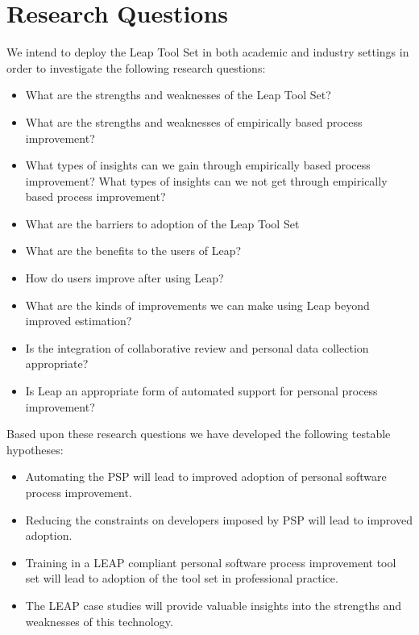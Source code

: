 \documentclass[12pt]{article}
\begin{document}
\section*{Research Questions}

We intend to deploy the Leap Tool Set in both academic and industry
settings in order to investigate the following research questions:
\begin{itemize}

\item{What are the strengths and weaknesses of the Leap Tool Set?}
  
\item{What are the strengths and weaknesses of empirically based process
    improvement?}
  
\item{What types of insights can we gain through empirically based
    process improvement?  What types of insights can we not get through
    empirically based process improvement?}

\item{What are the barriers to adoption of the Leap Tool Set}
  
\item{What are the benefits to the users of Leap?}

\item{How do users improve after using Leap?}
  
\item{What are the kinds of improvements we can make using Leap beyond
    improved estimation?}

\item{Is the integration of collaborative review and personal data
    collection appropriate?}
  
\item{Is Leap an appropriate form of automated support for personal process
    improvement?}

\end{itemize}

Based upon these research questions we have developed the following 
testable hypotheses:
\begin{itemize}
\item{Automating the PSP will lead to improved adoption of personal
    software process improvement.}

\item {Reducing the constraints on developers imposed by PSP will lead to
    improved adoption.}
  
\item {Training in a LEAP compliant personal software process improvement
    tool set will lead to adoption of the tool set in professional practice.}
  
\item {The LEAP case studies will provide valuable insights into the strengths
    and weaknesses of this technology.}

\end{itemize}
\end{document}
